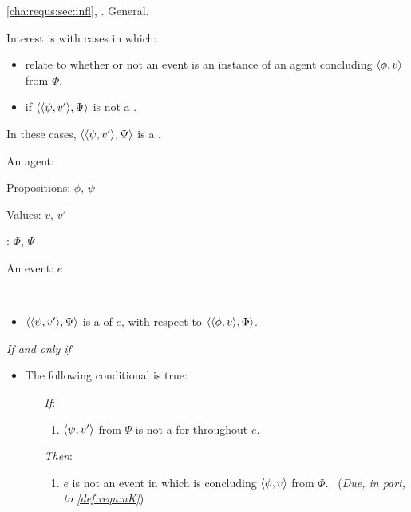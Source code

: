\begin{note}
  \autoref{cha:requs:sec:infl}, \ninf{}.
  General.

  Interest is with cases in which:
  \begin{itemize}
  \item
    \ninf{} relate to whether or not an event is an instance of an agent concluding \(\langle \phi, v \rangle\) from \(\Phi\).
  \item
    \ninf{} if \(\langle \langle \psi, v' \rangle, \Psi \rangle\) is not a \fc{}.
  \end{itemize}

  In these cases, \(\langle \langle \psi, v' \rangle, \Psi \rangle\) is a \requ{}.

  \begin{definition}[A \requ{0}]
    \label{def:requ}
    \begin{itemize*}[noitemsep, label=\(\circ\)]
    \item
      An agent: \vAgent{}
    \item
      Propositions: \(\phi\), \(\psi\)
    \item
      Values: \(v\), \(v'\)
    \item
      : \(\Phi\), \(\Psi\)
    \item
      An event: \(e\)
    \item
      \mbox{ }
    \end{itemize*}

    \begin{itemize}
    \item
      \(\langle \langle \psi, v' \rangle, \Psi \rangle\) is a \emph{\requ{}} of \(e\), with respect to \(\langle \langle \phi, v \rangle, \Phi \rangle\).
    \end{itemize}

    \emph{If and only if}

    \begin{itemize}
    \item
      The following conditional is true:
      \begin{itemize}
      \item[\emph{If}:]
        \begin{enumerate}[label=\alph*., ref=(\alph*), series=requDefSeries]
        \item
          \label{def:requ:nK}
          \(\langle \psi, v' \rangle\) from \(\Psi\) is not a \fc{} for \vAgent{} throughout \(e\).
        \end{enumerate}
      \item[\emph{Then}:]
        \begin{enumerate}[label=\alph*., ref=(\alph*), resume*=requDefSeries]
        \item
          \label{def:requ:nC}
          \(e\) is not an event in which \vAgent{} is concluding \(\langle \phi, v \rangle\) from \(\Phi\).\newline
          \mbox{ }\hfill(\emph{Due, in part, to \ref{def:requ:nK}})
        \end{enumerate}
      \end{itemize}
    \end{itemize}
    \vspace{-\baselineskip}
  \end{definition}
\end{note}

